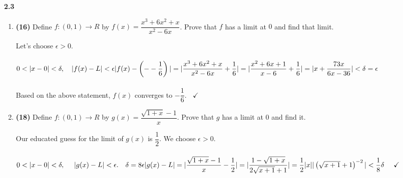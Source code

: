 \documentclass[fleqn]{article}
\begin{document}
  \textbf{2.3}
  \begin{enumerate}
    \item \textbf{(16)} Define $f: (0, 1) \longrightarrow R$ by $f(x)=\dfrac{x^3+6x^2+x}{x^2-6x}$. Prove that $f$ 
    has a limit at $0$ and find that limit. 

      \textcolor{hwColor}{
        Let's choose $\epsilon > 0$.
        \\
        \\
        $
          0 < |x-0| < \delta, ~~~ |f(x)-L| < \epsilon
          \\
          \\
          |f(x)-\left(--\dfrac{1}{6}\right)|
          \\
          \\
          =|\dfrac{x^3+6x^2+x}{x^2-6x}+\dfrac{1}{6}|
          \\
          \\
          =|\dfrac{x^2+6x+1}{x-6}+\dfrac{1}{6}|
          \\
          \\
          =|x+\dfrac{73x}{6x-36}| < \delta=\epsilon
        $
        \\
        \\
        Based on the above statement, $f(x)$ converges to $-\dfrac{1}{6}. ~~~~ \checkmark$
        \\
      }


    \item \textbf{(18)} Define $f: (0, 1) \longrightarrow R$ by $g(x)=\dfrac{\sqrt{1+x}-1}{x}$. Prove that $g$ has a limit
    at $0$ and find it.

      \textcolor{hwColor}{
        Our educated guess for the limit of $g(x)$ is $\dfrac{1}{2}$. We choose $\epsilon > 0$. 
        \\
        \\
        $
          0 < |x-0| < \delta, ~~~~ |g(x)-L| < \epsilon. ~~~ \delta=8 \epsilon
          \\
          \\
          |g(x)-L|
          \\
          \\
          \\
          =|\dfrac{\sqrt{1+x}-1}{x}-\dfrac{1}{2}|
          \\
          \\
          \\
          =|\dfrac{1-\sqrt{1+x}}{2\sqrt{x+1}+1}|
          \\
          \\
          \\
          =\dfrac{1}{2} |x| |\left(\sqrt{x+1}+1\right)^{-2}| < \dfrac{1}{8} \delta ~~~~ \checkmark
        $
        \\
      }



\end{enumerate}
\end{document}
